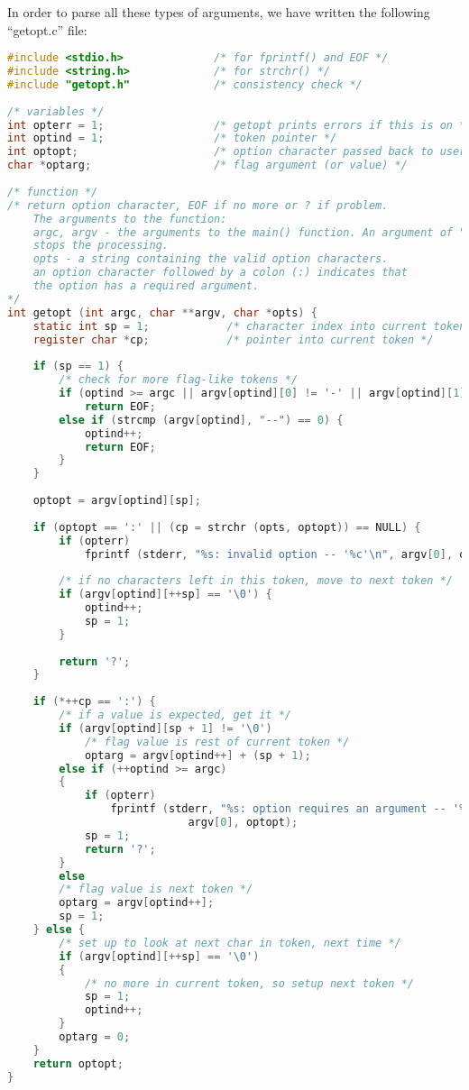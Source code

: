 In order to parse all these types of arguments, we have written the following
``getopt.c'' file:
\lstset{basicstyle=\scriptsize, numbers=left, captionpos=b, tabsize=4}
\begin{lstlisting}[caption=Section \thesection listing \arabic{optcnt},language={C},
breaklines=true,xleftmargin=15pt,label=lst:section\thesection listing\arabic{optcnt}]
#include <stdio.h>              /* for fprintf() and EOF */
#include <string.h>             /* for strchr() */
#include "getopt.h"             /* consistency check */
 
/* variables */
int opterr = 1;                 /* getopt prints errors if this is on */
int optind = 1;                 /* token pointer */
int optopt;                     /* option character passed back to user */
char *optarg;                   /* flag argument (or value) */
 
/* function */
/* return option character, EOF if no more or ? if problem.
	The arguments to the function:
	argc, argv - the arguments to the main() function. An argument of "--"
	stops the processing.
	opts - a string containing the valid option characters.
	an option character followed by a colon (:) indicates that
	the option has a required argument.
*/
int getopt (int argc, char **argv, char *opts) {
	static int sp = 1;            /* character index into current token */
	register char *cp;            /* pointer into current token */
 
	if (sp == 1) {
		/* check for more flag-like tokens */
		if (optind >= argc || argv[optind][0] != '-' || argv[optind][1] == '\0')
			return EOF;
		else if (strcmp (argv[optind], "--") == 0) {
			optind++;
			return EOF;
		}
	}
 
	optopt = argv[optind][sp];
 
	if (optopt == ':' || (cp = strchr (opts, optopt)) == NULL) {
		if (opterr)
			fprintf (stderr, "%s: invalid option -- '%c'\n", argv[0], optopt);
 
		/* if no characters left in this token, move to next token */
		if (argv[optind][++sp] == '\0') {
			optind++;
			sp = 1;
		}
 
		return '?';
	}
 
	if (*++cp == ':') {
		/* if a value is expected, get it */
		if (argv[optind][sp + 1] != '\0')
			/* flag value is rest of current token */
			optarg = argv[optind++] + (sp + 1);
		else if (++optind >= argc)
		{
			if (opterr)
				fprintf (stderr, "%s: option requires an argument -- '%c'\n",
							argv[0], optopt);
			sp = 1;
			return '?';
		}
		else
		/* flag value is next token */
		optarg = argv[optind++];
		sp = 1;
	} else {
		/* set up to look at next char in token, next time */
		if (argv[optind][++sp] == '\0')
		{
			/* no more in current token, so setup next token */
			sp = 1;
			optind++;
		}
		optarg = 0;
	}
	return optopt;
} 
\end{lstlisting}

